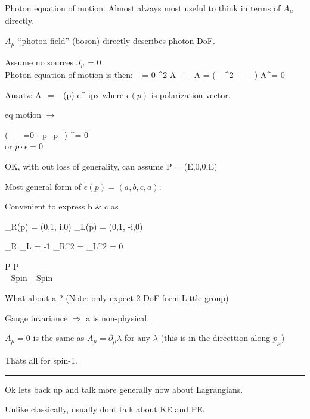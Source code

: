{\underline{Photon equation of motion.}
Almost always most useful to think in terms of $A_\mu$ directly. 

$A_\mu$ ``photon field'' (boson) directly describes photon DoF.

Assume no sources $J_\mu$ = 0\\
Photon equation of motion is then:
\be
\partial_\mu \fMN  = 0  \Rightarrow  \partial^2 A_\mu - \partial_\mu \partial \cdot A = (\eta_{\mu\nu} \partial^2 - \partial_\mu  \partial_\nu ) A^\nu = 0
\ee


\underline{Ansatz}:
\be
A_\mu = \epsilon_\mu(p) e^{-ip\cdot x}
\ee
where $\epsilon(p)$ is  polarization vector.

eq motion $\rightarrow$ 

\bea
(\eta_{\mu\nu} _{=0} - p_\mu  p_\nu ) \epsilon^\nu = 0\\
\eea
or $p\cdot \epsilon = 0$

OK, with out loss of generality, can assume
\be
P = (E,0,0,E)
\ee 

Most general form of $\epsilon(p) = (a, b, c, a)$. 


Convenient to express b \& c as

\be
\epsilon_R(p) = (0,1, i,0)  \hspace{1in} \epsilon_L(p) = (0,1, -i,0)
\ee


\be
\epsilon_R \cdot \epsilon_L = -1 \hspace{1in}  {\epsilon_R}^2 = {\epsilon_L}^2 = 0
\ee

\bea
\longrightarrow P \hspace{1in} \longrightarrow P\\
\underbrace{\rightarrow}_{Spin} \hspace{1in}  \underbrace{\leftarrow}_{Spin}
\eea


What about a ? 
(Note: only expect 2 DoF form Little group) 

Gauge invariance $\Rightarrow$ a is non-physical. 


$A_\mu = 0 $ is \underline{\underline{the same}} as $A_\mu = \partial_\mu \lambda$ for any $\lambda$
(this is in the directtion along $p_\mu$)

Thats all for spin-1. 

\noindent\rule{\textwidth}{1pt}

Ok lets back up and talk more generally now about Lagrangians. 

Unlike classically, usually dont talk about KE and PE. 

}
